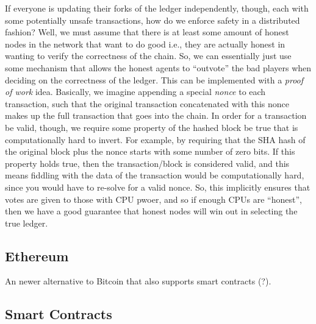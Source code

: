 \documentclass[10pt,a4paper]{article}
\begin{document}
If everyone is updating their forks of the ledger independently, though, each with some potentially unsafe transactions, how do we enforce safety in a distributed fashion? Well, we must assume that there is at least some amount of honest nodes in the network that want to do good i.e., they are actually honest in wanting to verify the correctness of the chain. So, we can essentially just use some mechanism that allows the honest agents to ``outvote'' the bad players when deciding on the correctness of the ledger. This can be implemented with a \textit{proof of work} idea. Basically, we imagine appending a special \textit{nonce} to each transaction, such that the original transaction concatenated with this nonce makes up the full transaction that goes into the chain. In order for a transaction be valid, though, we require some property of the hashed block be true that is computationally hard to invert. For example, by requiring that the SHA hash of the original block plus the nonce starts with some number of zero bits. If this property holds true, then the transaction/block is considered valid, and this means fiddling with the data of the transaction would be computationally hard, since you would have to re-solve for a valid nonce. So, this implicitly ensures that votes are given to those with CPU pwoer, and so if enough CPUs are ``honest'', then we have a good guarantee that honest nodes will win out in selecting the true ledger. 


\subsection*{Ethereum}

An newer alternative to Bitcoin that also supports smart contracts (?).

\subsection*{Smart Contracts}





\end{document}
